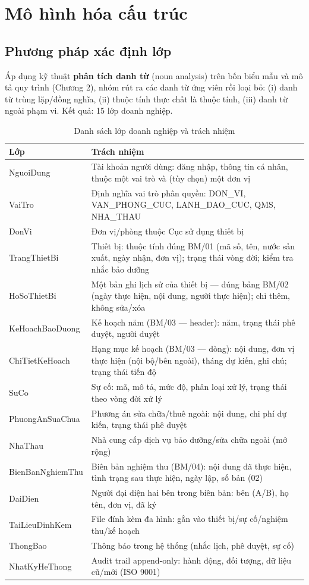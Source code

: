 \chapter{Mô hình hóa cấu trúc}

\section{Phương pháp xác định lớp}

Áp dụng kỹ thuật \textbf{phân tích danh từ} (noun analysis) trên bốn biểu mẫu và mô tả quy trình (Chương 2), nhóm rút ra các danh từ ứng viên rồi loại bỏ: (i) danh từ trùng lặp/đồng nghĩa, (ii) thuộc tính thực chất là thuộc tính, (iii) danh từ ngoài phạm vi. Kết quả: 15 lớp doanh nghiệp.

\begin{table}[h]
\centering
\caption{Danh sách lớp doanh nghiệp và trách nhiệm}
\label{tab:classes}
\begin{tabular}{P{3.4cm}P{12cm}}
\toprule
\textbf{Lớp} & \textbf{Trách nhiệm} \\
\midrule
NguoiDung & Tài khoản người dùng: đăng nhập, thông tin cá nhân, thuộc một vai trò và (tùy chọn) một đơn vị \\
VaiTro & Định nghĩa vai trò phân quyền: DON\_VI, VAN\_PHONG\_CUC, LANH\_DAO\_CUC, QMS, NHA\_THAU \\
DonVi & Đơn vị/phòng thuộc Cục sử dụng thiết bị \\
TrangThietBi & Thiết bị: thuộc tính đúng BM/01 (mã số, tên, nước sản xuất, ngày nhận, đơn vị); trạng thái vòng đời; kiểm tra nhắc bảo dưỡng \\
HoSoThietBi & Một bản ghi lịch sử của thiết bị — đúng bảng BM/02 (ngày thực hiện, nội dung, người thực hiện); chỉ thêm, không sửa/xóa \\
KeHoachBaoDuong & Kế hoạch năm (BM/03 — header): năm, trạng thái phê duyệt, người duyệt \\
ChiTietKeHoach & Hạng mục kế hoạch (BM/03 — dòng): nội dung, đơn vị thực hiện (nội bộ/bên ngoài), tháng dự kiến, ghi chú; trạng thái tiến độ \\
SuCo & Sự cố: mã, mô tả, mức độ, phân loại xử lý, trạng thái theo vòng đời xử lý \\
PhuongAnSuaChua & Phương án sửa chữa/thuê ngoài: nội dung, chi phí dự kiến, trạng thái phê duyệt \\
NhaThau & Nhà cung cấp dịch vụ bảo dưỡng/sửa chữa ngoài (mở rộng) \\
BienBanNghiemThu & Biên bản nghiệm thu (BM/04): nội dung đã thực hiện, tình trạng sau thực hiện, ngày lập, số bản (02) \\
DaiDien & Người đại diện hai bên trong biên bản: bên (A/B), họ tên, đơn vị, đã ký \\
TaiLieuDinhKem & File đính kèm đa hình: gắn vào thiết bị/sự cố/nghiệm thu/kế hoạch \\
ThongBao & Thông báo trong hệ thống (nhắc lịch, phê duyệt, sự cố) \\
NhatKyHeThong & Audit trail append-only: hành động, đối tượng, dữ liệu cũ/mới (ISO 9001) \\
\bottomrule
\end{tabular}
\end{table}

